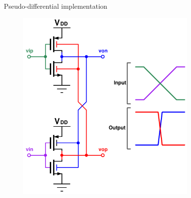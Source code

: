\documentclass[t, screen, aspectratio=43]{beamer}
\begin{document}
\begin{frame}
\begin{block}{Pseudo-differential implementation}
\begin{minipage}{6cm}
\begin{itemize}[itemsep=4pt,label=\protect---]
			\end{itemize}
		\end{minipage}%
		\begin{minipage}{6cm}
			\begin{figure}[htb!]
			        \centering
			        \includegraphics[width=0.8\textwidth, angle=0]{pseudiff_buffer}
			\end{figure}
		\end{minipage}%

	\end{block}	
\end{frame}
\end{document}
